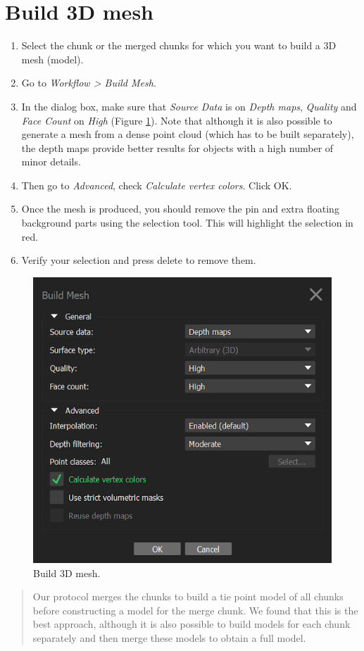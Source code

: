 \documentclass[
]{book}
\begin{document}
\hypertarget{build-3d-mesh}{%
\section{Build 3D mesh}\label{build-3d-mesh}}

\begin{enumerate}
\def\labelenumi{\arabic{enumi}.}
\item
  Select the chunk or the merged chunks for which you want to build a
  3D mesh (model).
\item
  Go to \emph{Workflow \textgreater{} Build Mesh}.
\item
  In the dialog box, make sure that \emph{Source Data} is on \emph{Depth maps},
  \emph{Quality} and \emph{Face Count} on \emph{High} (Figure \ref{fig:build3Dmesh}).
  Note that although it is also possible to generate a mesh from a
  dense point cloud (which has to be built separately), the depth maps
  provide better results for objects with a high number of minor
  details.
\item
  Then go to \emph{Advanced}, check \emph{Calculate vertex colors}. Click OK.
\item
  Once the mesh is produced, you should remove the pin and extra
  floating background parts using the selection tool. This will
  highlight the selection in red.
\item
  Verify your selection and press delete to remove them.
\end{enumerate}

\begin{figure}

{\centering \includegraphics[width=0.5\linewidth]{Figures/metashape_build_mesh} 

}

\caption{Build 3D mesh.}\label{fig:build3Dmesh}
\end{figure}

\begin{quote}
Our protocol merges the chunks to build a tie point model of all chunks
before constructing a model for the merge chunk. We found that this is
the best approach, although it is also possible to build models for each
chunk separately and then merge these models to obtain a full model.
\end{quote}
\end{document}
